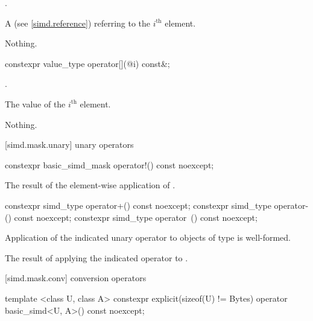 \begin{itemdescr}
  \pnum\expects
  .

  \pnum\returns
  A  (see \ref{simd.reference}) referring to the $i^\text{th}$ element.

  \pnum\throws Nothing.
\end{itemdescr}

\begin{itemdecl}
constexpr value_type operator[](@\simdsizetype@ i) const&;
\end{itemdecl}

\begin{itemdescr}
  \pnum\expects
  .

  \pnum\returns
  The value of the $i^\text{th}$ element.

  \pnum\throws Nothing.
\end{itemdescr}

[simd.mask.unary]{ unary operators}

\begin{itemdecl}
constexpr basic_simd_mask operator!() const noexcept;
\end{itemdecl}

\begin{itemdescr}
  \pnum\returns
  The result of the element-wise application of .
\end{itemdescr}

\begin{itemdecl}
constexpr simd_type operator+() const noexcept;
constexpr simd_type operator-() const noexcept;
constexpr simd_type operator~() const noexcept;
\end{itemdecl}

\begin{itemdescr}
  \pnum\constraints
  Application of the indicated unary operator to objects of type  is well-formed.

  \pnum\returns
  The result of applying the indicated operator to .
\end{itemdescr}

[simd.mask.conv]{ conversion operators}

\begin{itemdecl}
template <class U, class A>
  constexpr explicit(sizeof(U) != Bytes) operator basic_simd<U, A>() const noexcept;
\end{itemdecl}


